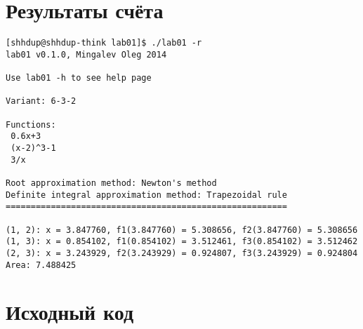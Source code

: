 \documentclass{report}
\begin{document}
\chapter{Результаты счёта}
\begin{Verbatim}[frame=single,baselinestretch=0.5]
[shhdup@shhdup-think lab01]$ ./lab01 -r
lab01 v0.1.0, Mingalev Oleg 2014

Use lab01 -h to see help page

Variant: 6-3-2

Functions:
 0.6x+3
 (x-2)^3-1
 3/x

Root approximation method: Newton's method
Definite integral approximation method: Trapezoidal rule
========================================================

(1, 2): x = 3.847760, f1(3.847760) = 5.308656, f2(3.847760) = 5.308656
(1, 3): x = 0.854102, f1(0.854102) = 3.512461, f3(0.854102) = 3.512462
(2, 3): x = 3.243929, f2(3.243929) = 0.924807, f3(3.243929) = 0.924804
Area: 7.488425
\end{Verbatim}

\appendix
\chapter{Исходный код}








\end{document}
